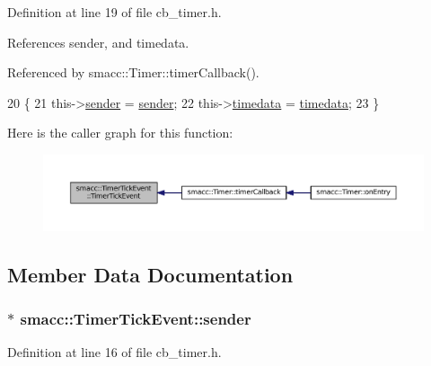 Definition at line 19 of file cb\+\_\+timer.\+h.



References sender, and timedata.



Referenced by smacc\+::\+Timer\+::timer\+Callback().


\begin{DoxyCode}
20   \{
21     this->\hyperlink{structsmacc_1_1TimerTickEvent_adeac356195d07acbee0ec2e02bf2d500}{sender} = \hyperlink{structsmacc_1_1TimerTickEvent_adeac356195d07acbee0ec2e02bf2d500}{sender};
22     this->\hyperlink{structsmacc_1_1TimerTickEvent_afac83d8b00999b26c2365932030389e9}{timedata} = \hyperlink{structsmacc_1_1TimerTickEvent_afac83d8b00999b26c2365932030389e9}{timedata};
23   \}
\end{DoxyCode}


Here is the caller graph for this function\+:
\nopagebreak
\begin{figure}[H]
\begin{center}
\leavevmode
\includegraphics[width=350pt]{structsmacc_1_1TimerTickEvent_aa41996c36a5cad4b74ea5ca09c187943_icgraph}
\end{center}
\end{figure}




\subsection{Member Data Documentation}
\subsubsection[{\texorpdfstring{sender}{sender}}]{$\ast$ smacc\+::\+Timer\+Tick\+Event\+::sender}\hypertarget{structsmacc_1_1TimerTickEvent_adeac356195d07acbee0ec2e02bf2d500}{}\label{structsmacc_1_1TimerTickEvent_adeac356195d07acbee0ec2e02bf2d500}


Definition at line 16 of file cb\+\_\+timer.\+h.



